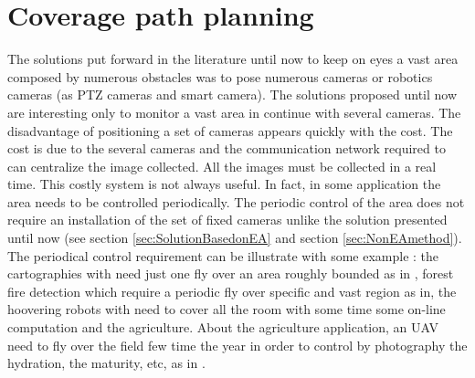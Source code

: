  
%
%
% 


\section{Coverage path planning}

The solutions put forward in the literature until now to keep on eyes a vast area composed by numerous obstacles was to pose numerous cameras or robotics cameras (as PTZ cameras and smart camera).
The solutions proposed until now are interesting only to monitor a vast area  in continue with several cameras. 
The disadvantage of positioning a set of cameras appears quickly with the cost. The cost is due to the several cameras and the communication network required to can centralize the image collected. All the images must be collected in a real time. This costly system is not always useful. 
In fact, in some application the area needs to be controlled periodically. The periodic control of the area does not require an installation of the set of fixed cameras unlike the solution presented until now (see section \ref{sec:SolutionBasedonEA} and section \ref{sec:NonEAmethod}). The periodical control requirement can be illustrate with some example :  the cartographies with need just one fly over an area roughly bounded as in \citep{66*galceran2013,164*valente2013}, forest fire detection which require a periodic fly over specific and vast region as in\cite{237*casbeer2006}, the hoovering robots with need to cover all the room with some time some on-line computation \citep{218*meiting2007,216*luo2002,215*lee2010,196*yang2004}  and the agriculture.
 About the agriculture application, an UAV need to fly over the field few time the year in order to control by photography the hydration, the maturity, etc, as in \citep{164*valente2013,203*zarco2008,63*chao2008,105*long199,167*barrientos2011,177*lelong2008}. %

